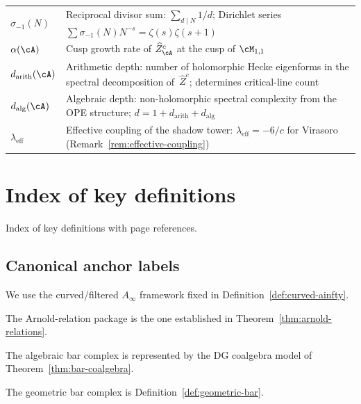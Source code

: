 \begin{longtable}{p{3cm} p{10cm}}
$\sigma_{-1}(N)$ & Reciprocal divisor sum:
 $\sum_{d\mid N}1/d$; Dirichlet series
 $\sum\sigma_{-1}(N)N^{-s}=\zeta(s)\zeta(s{+}1)$ \\
$\alpha(\cA)$ & Cusp growth rate of
 $\widehat{Z}^c_\cA$ at the cusp of
 $\cM_{1,1}$ \\
$d_{\mathrm{arith}}(\cA)$ & Arithmetic depth:
 number of holomorphic Hecke eigenforms in the spectral
 decomposition of~$\widehat{Z}^c$; determines critical-line
 count \\
$d_{\mathrm{alg}}(\cA)$ & Algebraic depth:
 non-holomorphic spectral complexity from the OPE structure;
 $d = 1 + d_{\mathrm{arith}} + d_{\mathrm{alg}}$ \\
$\lambda_{\mathrm{eff}}$ & Effective coupling of the shadow
 tower: $\lambda_{\mathrm{eff}} = -6/c$ for Virasoro
 (Remark~\ref{rem:effective-coupling}) \\
\end{longtable}


\section{Index of key definitions}
\label{sec:index-definitions}

Index of key definitions with page references.

\subsection*{Canonical anchor labels}

\begin{definition}\label{def:ainf-algebra}
We use the curved/filtered \(A_\infty\) framework fixed in Definition~\ref{def:curved-ainfty}.
\end{definition}

\begin{definition}\label{def:arnold-relations}
The Arnold-relation package is the one established in Theorem~\ref{thm:arnold-relations}.
\end{definition}

\begin{definition}\label{def:bar-complex-algebraic}
The algebraic bar complex is represented by the DG coalgebra model of Theorem~\ref{thm:bar-coalgebra}.
\end{definition}

\begin{definition}\label{def:geometric-bar-complex}
The geometric bar complex is Definition~\ref{def:geometric-bar}.
\end{definition}

